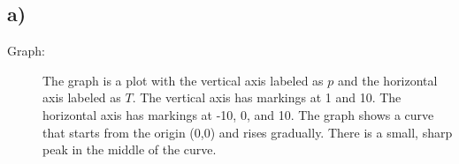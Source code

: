 

\subsection*{a)}

\begin{description}
    \item[Graph:] The graph is a plot with the vertical axis labeled as \( p \) and the horizontal axis labeled as \( T \). The vertical axis has markings at 1 and 10. The horizontal axis has markings at -10, 0, and 10. The graph shows a curve that starts from the origin (0,0) and rises gradually. There is a small, sharp peak in the middle of the curve.
\end{description}